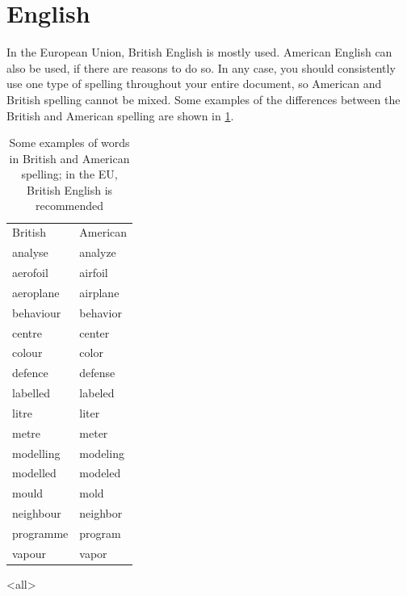 \section{English}\label{sec:formatenglish}
In the European Union, British English is mostly used. American English can also be used, if there are reasons to do so. In any case, you should consistently use one type of spelling throughout your entire document, so American and British spelling cannot be mixed. Some examples of the differences between the British and American spelling are shown in \cref{tab:english}.

\begin{table}[b]\centering
	 \caption{Some examples of words in British and American spelling; in the EU, British English is recommended}\label{tab:english}
        \begin{tabular}{ll}
            \toprule
             British        & American\\[+1.5ex]
             analyse        & analyze\\
             aerofoil       & airfoil\\
             aeroplane      & airplane\\
             behaviour      & behavior\\
             centre         & center\\
             colour         & color\\
             defence        & defense\\
             labelled       & labeled\\
             litre          & liter\\
             metre          & meter\\
             modelling      & modeling\\
             modelled       & modeled\\
             mould          & mold\\
             neighbour      & neighbor\\
             programme      & program\\
             vapour         & vapor\\
             \bottomrule
        \end{tabular}
\end{table}

\mode<all> 











